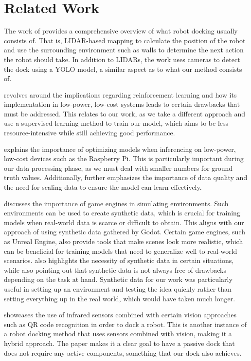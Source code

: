 \section{Related Work}
The work of \citet{app131910675} provides a comprehensive overview of what robot docking usually consists of. That is, LIDAR-based mapping to calculate the position of the robot and use the surrounding environment such as walls to determine the next action the robot should take. In addition to LIDARs, the work uses cameras to detect the dock using a YOLO model, a similar aspect as to what our method consists of.

\citet{Deisenroth2012} revolves around the implications regarding reinforcement learning and how its implementation in low-power, low-cost systems leads to certain drawbacks that must be addressed. This relates to our work, as we take a different approach and use a supervised learning method to train our model, which aims to be less resource-intensive while still achieving good performance.

\citet{ameen2023optimizingdeeplearningmodels} explains the importance of optimizing models when inferencing on low-power, low-cost devices such as the Raspberry Pi. This is particularly important during our data processing phase, as we must deal with smaller numbers for ground truth values. Additionally, \citet{SINGH2020105524} further emphasizes the importance of data quality and the need for scaling data to ensure the model can learn effectively.

\citet{hoster2024usinggameenginesmachine} discusses the importance of game engines in simulating environments. Such environments can be used to create synthetic data, which is crucial for training models when real-world data is scarce or difficult to obtain. This aligns with our approach of using synthetic data gathered by Godot. Certain game engines, such as Unreal Engine, also provide tools that make scenes look more realistic, which can be beneficial for training models that need to generalize well to real-world scenarios. \citet{depth_anything_v2} also highlights the necessity of synthetic data in certain situations, while also pointing out that synthetic data is not always free of drawbacks depending on the task at hand. Synthetic data for our work was particularly useful in setting up an environment and testing the idea quickly rather than setting everything up in the real world, which would have taken much longer.

\citet{quilez:hal-01147332} showcases the use of infrared sensors combined with certain vision approaches such as QR code recognition in order to dock a robot. This is another instance of a robot docking method that uses sensors combined with vision, making it a hybrid approach. The paper makes it a clear goal to have a passive dock that does not require any active components, something that our dock also achieves.
